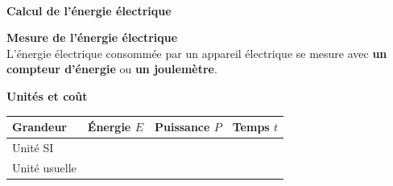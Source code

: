 \documentclass[11pt,a4paper]{article}
\newcommand{\cadreblanc}[1]{%
\medskip\framebox[\linewidth][c]{%
\rule{0mm}{#1mm}}\par
\medskip}
\newenvironment{itemize*}%
    {\begin{itemize}%
      \setlength{\itemsep}{0pt}%
      \setlength{\parskip}{0pt}}%
    {\end{itemize}}
\begin{document}
\\[-3mm]
\begin{itemize*}
    \item \textbf{Calcul de l'énergie électrique}\\
    \noindent%
\begin{minipage}{.67\textwidth}%
    \cadreblanc{20}

\end{minipage}%
\hfill
\begin{minipage}{.25\textwidth}%
\cadreblanc{20}
\end{minipage}%



    \item \textbf{Mesure de l'énergie électrique}\\
    L'énergie électrique consommée par un appareil électrique se mesure avec \textbf{un compteur d'énergie} ou \textbf{un joulemètre}. 
    \item \textbf{Unités et coût}\\
    \vspace{-5mm}\begin{center}
    

    \begin{tabular}{|C{3cm}|C{3cm}|C{3cm}|C{3cm}|}
         \hline
        Grandeur & Énergie $E$ & Puissance $P$ & Temps $t$\\
         \hline
        Unité SI &  &  &   \\
         \hline
         Unité usuelle &  &  &   \\
         \hline
        
    \end{tabular}
\end{center}
\cadreblanc{20}
\end{itemize*}
\end{document}

